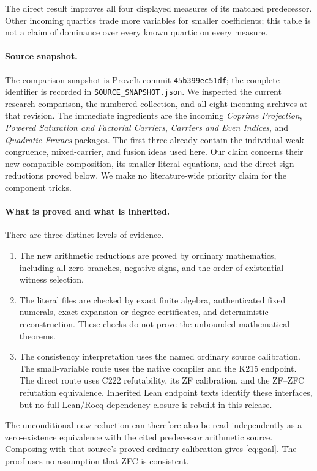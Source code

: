 \documentclass[11pt]{article}
\theoremstyle{definition}
\theoremstyle{remark}
\begin{document}
The direct result improves all four displayed measures of its matched
predecessor. Other incoming quartics trade more variables for smaller
coefficients; this table is not a claim of dominance over every known
quartic on every measure.

\paragraph{Source snapshot.}
The comparison snapshot is ProveIt commit \texttt{45b399ec51df};
the complete identifier is recorded in \texttt{SOURCE\_SNAPSHOT.json}.
We inspected the
current research comparison, the numbered collection, and all eight
incoming archives at that revision. The immediate ingredients are the
incoming \emph{Coprime Projection}, \emph{Powered Saturation and
Factorial Carriers}, \emph{Carriers and Even Indices}, and
\emph{Quadratic Frames} packages\cite{repo,incoming}. The first three
already contain the individual weak-congruence, mixed-carrier, and
fusion ideas used here. Our claim concerns their new compatible
composition, its smaller literal equations, and the direct sign
reductions proved below. We make no literature-wide priority claim for
the component tricks.

\paragraph{What is proved and what is inherited.}
There are three distinct levels of evidence.
\begin{enumerate}
\item The new arithmetic reductions are proved by ordinary mathematics,
      including all zero branches, negative signs, and the order of
      existential witness selection.
\item The literal files are checked by exact finite algebra, authenticated
      fixed numerals, exact expansion or degree certificates, and
      deterministic reconstruction. These checks do not prove the
      unbounded mathematical theorems.
\item The consistency interpretation uses the named ordinary source
      calibration. The small-variable route uses the native compiler
      and the K215 endpoint. The direct route uses C222 refutability,
      its ZF calibration, and the ZF--ZFC refutation equivalence.
      Inherited Lean endpoint texts identify these interfaces, but no
      full Lean/Rocq dependency closure is rebuilt in this release.
\end{enumerate}
The unconditional new reduction can therefore also be read independently
as a zero-existence equivalence with the cited predecessor arithmetic
source. Composing with that source's proved ordinary calibration gives
\eqref{eq:goal}. The proof uses no assumption that ZFC is consistent.
\end{document}
